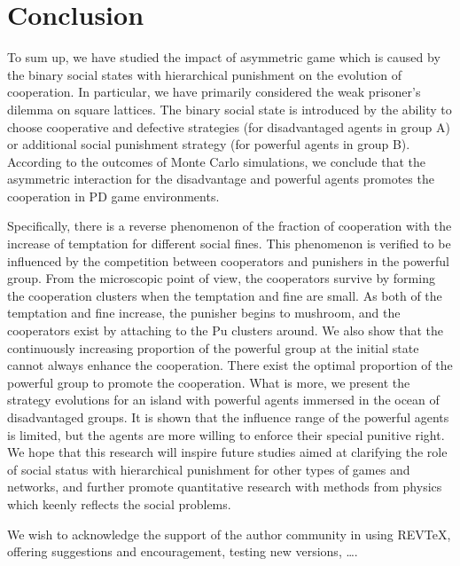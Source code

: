 \documentclass[%
 aip,
 amsmath,amssymb,
 reprint,%
]{revtex4-1}
\begin{document}
\section{\label{sec:level1}Conclusion}
To sum up, we have studied the impact of asymmetric game which is caused by the binary social states with hierarchical punishment on the evolution of cooperation. In particular, we have primarily considered the weak prisoner's dilemma on square lattices. The binary social state is introduced by the ability to choose cooperative and defective strategies (for disadvantaged agents in group A) or additional social punishment strategy (for powerful agents in group B). According to the outcomes of Monte Carlo simulations, we conclude that the asymmetric interaction for the disadvantage and powerful agents promotes the cooperation in PD game environments.

Specifically, there is a reverse phenomenon of the fraction of cooperation with the increase of temptation for different social fines. This phenomenon is verified to be influenced by the competition between cooperators and punishers in the powerful group. From the microscopic point of view, the cooperators survive by forming the cooperation clusters when the temptation and fine are small. As both of the temptation and fine increase, the punisher begins to mushroom, and the cooperators exist by attaching to the Pu clusters around. We also show that the continuously increasing proportion of the powerful group at the initial state cannot always enhance the cooperation. There exist the optimal proportion of the powerful group to promote the cooperation. What is more, we present the strategy evolutions for an island with powerful agents immersed in the ocean of disadvantaged groups. It is shown that the influence range of the powerful agents is limited, but the agents are more willing to enforce their special punitive right. We hope that this research will inspire future studies aimed at clarifying the role of social status with hierarchical punishment for other types of games and networks, and further promote quantitative research with methods from physics which keenly reflects the social problems.



%
%

%
%





\begin{acknowledgments}
We wish to acknowledge the support of the author community in using
REV\TeX{}, offering suggestions and encouragement, testing new versions,
\dots.
\end{acknowledgments}



\nocite{*}
\end{document}
